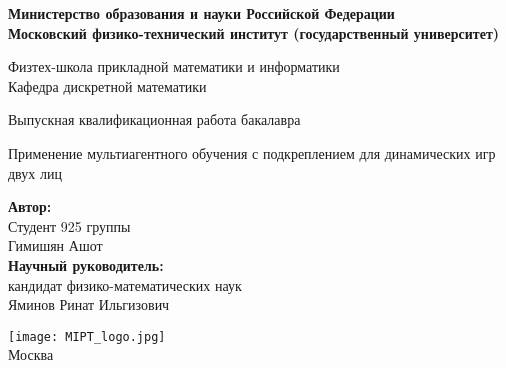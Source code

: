 \begin{center}
    \large\textbf{Министерство образования и науки Российской Федерации \\
    Московский физико-технический институт (государственный университет)} \\
    \vspace{1cm}

    Физтех-школа прикладной математики и информатики \\

    Кафедра дискретной математики \\

    \vspace{3em}

    Выпускная квалификационная работа бакалавра
\end{center}

\begin{center}
    \vspace{\fill}
    \LARGE{Применение мультиагентного обучения с подкреплением для динамических игр двух лиц}

    \vspace{\fill}
\end{center}


\begin{flushright}
    \textbf{Автор:} \\
    Студент 925 группы \\
    Гимишян Ашот \\
    \vspace{2em}
    \textbf{Научный руководитель:} \\
    кандидат физико-математических наук \\
    Яминов Ринат Ильгизович \\
    \vspace{2em}
\end{flushright}

\vspace{7em}

\begin{center}
    \texttt{[image: MIPT\_logo.jpg]}\\
    Москва \the\year{}
\end{center}

\thispagestyle{empty}


\setcounter{page}{2}
